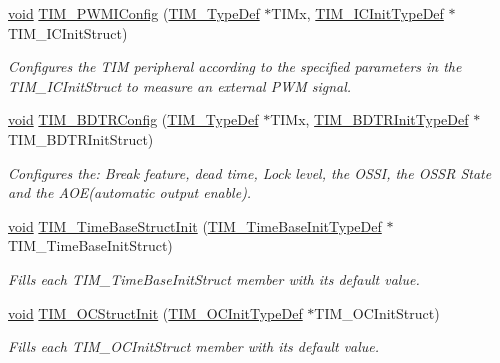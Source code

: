 \begin{DoxyCompactItemize}
\hyperlink{usb__devapi_8h_afabf60e7f57651d6d595a02c75f07cd0}{void} \hyperlink{group___t_i_m___exported___functions_gaa71f9296556310f85628d6c748a06475}{T\+I\+M\+\_\+\+P\+W\+M\+I\+Config} (\hyperlink{struct_t_i_m___type_def}{T\+I\+M\+\_\+\+Type\+Def} $\ast$T\+I\+Mx, \hyperlink{struct_t_i_m___i_c_init_type_def}{T\+I\+M\+\_\+\+I\+C\+Init\+Type\+Def} $\ast$T\+I\+M\+\_\+\+I\+C\+Init\+Struct)
\begin{DoxyCompactList}\small\item\em Configures the T\+IM peripheral according to the specified parameters in the T\+I\+M\+\_\+\+I\+C\+Init\+Struct to measure an external P\+WM signal. \end{DoxyCompactList}\item 
\hyperlink{usb__devapi_8h_afabf60e7f57651d6d595a02c75f07cd0}{void} \hyperlink{group___t_i_m___exported___functions_ga3df4ba3f0727f63ce621e2b2e6035d4f}{T\+I\+M\+\_\+\+B\+D\+T\+R\+Config} (\hyperlink{struct_t_i_m___type_def}{T\+I\+M\+\_\+\+Type\+Def} $\ast$T\+I\+Mx, \hyperlink{struct_t_i_m___b_d_t_r_init_type_def}{T\+I\+M\+\_\+\+B\+D\+T\+R\+Init\+Type\+Def} $\ast$T\+I\+M\+\_\+\+B\+D\+T\+R\+Init\+Struct)
\begin{DoxyCompactList}\small\item\em Configures the\+: Break feature, dead time, Lock level, the O\+S\+SI, the O\+S\+SR State and the A\+O\+E(automatic output enable). \end{DoxyCompactList}\item 
\hyperlink{usb__devapi_8h_afabf60e7f57651d6d595a02c75f07cd0}{void} \hyperlink{group___t_i_m___exported___functions_ga1556a0b9a5d53506875fd7de0cbc6b1f}{T\+I\+M\+\_\+\+Time\+Base\+Struct\+Init} (\hyperlink{struct_t_i_m___time_base_init_type_def}{T\+I\+M\+\_\+\+Time\+Base\+Init\+Type\+Def} $\ast$T\+I\+M\+\_\+\+Time\+Base\+Init\+Struct)
\begin{DoxyCompactList}\small\item\em Fills each T\+I\+M\+\_\+\+Time\+Base\+Init\+Struct member with its default value. \end{DoxyCompactList}\item 
\hyperlink{usb__devapi_8h_afabf60e7f57651d6d595a02c75f07cd0}{void} \hyperlink{group___t_i_m___exported___functions_ga394683c78ae02837882e36014e11643e}{T\+I\+M\+\_\+\+O\+C\+Struct\+Init} (\hyperlink{struct_t_i_m___o_c_init_type_def}{T\+I\+M\+\_\+\+O\+C\+Init\+Type\+Def} $\ast$T\+I\+M\+\_\+\+O\+C\+Init\+Struct)
\begin{DoxyCompactList}\small\item\em Fills each T\+I\+M\+\_\+\+O\+C\+Init\+Struct member with its default value. \end{DoxyCompactList}\item 

\end{DoxyCompactItemize}
